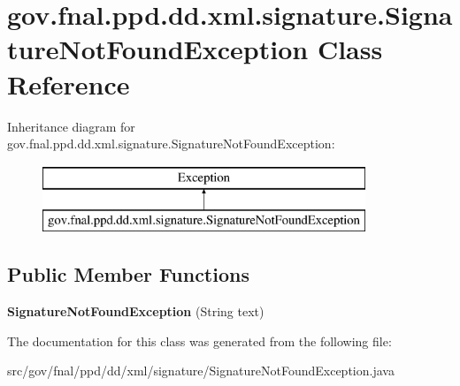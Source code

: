 \hypertarget{classgov_1_1fnal_1_1ppd_1_1dd_1_1xml_1_1signature_1_1SignatureNotFoundException}{\section{gov.\-fnal.\-ppd.\-dd.\-xml.\-signature.\-Signature\-Not\-Found\-Exception Class Reference}
\label{classgov_1_1fnal_1_1ppd_1_1dd_1_1xml_1_1signature_1_1SignatureNotFoundException}
}
Inheritance diagram for gov.\-fnal.\-ppd.\-dd.\-xml.\-signature.\-Signature\-Not\-Found\-Exception\-:\begin{figure}[H]
\begin{center}
\leavevmode
\includegraphics[height=2.000000cm]{classgov_1_1fnal_1_1ppd_1_1dd_1_1xml_1_1signature_1_1SignatureNotFoundException}
\end{center}
\end{figure}
\subsection*{Public Member Functions}
\begin{DoxyCompactItemize}
\item 
\hypertarget{classgov_1_1fnal_1_1ppd_1_1dd_1_1xml_1_1signature_1_1SignatureNotFoundException_af80eae7d40d4d237e1f236753ce468e5}{{\bfseries Signature\-Not\-Found\-Exception} (String text)}\label{classgov_1_1fnal_1_1ppd_1_1dd_1_1xml_1_1signature_1_1SignatureNotFoundException_af80eae7d40d4d237e1f236753ce468e5}

\end{DoxyCompactItemize}


The documentation for this class was generated from the following file\-:\begin{DoxyCompactItemize}
\item 
src/gov/fnal/ppd/dd/xml/signature/Signature\-Not\-Found\-Exception.\-java\end{DoxyCompactItemize}
